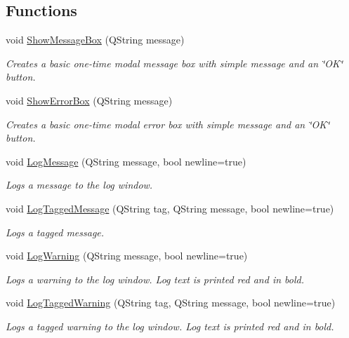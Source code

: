 \subsection*{Functions}
\begin{DoxyCompactItemize}
\item 
void \hyperlink{group___global_variables_ga9551f73a6927861d0b6f5d7901c90888}{Show\-Message\-Box} (Q\-String message)
\begin{DoxyCompactList}\small\item\em Creates a basic one-\/time modal message box with simple message and an \char`\"{}\-O\-K\char`\"{} button. \end{DoxyCompactList}\item 
void \hyperlink{group___global_variables_gadf8a13f3d23660f424828d7f559addd3}{Show\-Error\-Box} (Q\-String message)
\begin{DoxyCompactList}\small\item\em Creates a basic one-\/time modal error box with simple message and an \char`\"{}\-O\-K\char`\"{} button. \end{DoxyCompactList}\item 
void \hyperlink{group___global_variables_ga9bb2d01dee132ec096040ba459b4e2e4}{Log\-Message} (Q\-String message, bool newline=true)
\begin{DoxyCompactList}\small\item\em Logs a message to the log window. \end{DoxyCompactList}\item 
void \hyperlink{group___global_variables_ga577d74a77b480346d9aa74680d6e7020}{Log\-Tagged\-Message} (Q\-String tag, Q\-String message, bool newline=true)
\begin{DoxyCompactList}\small\item\em Logs a tagged message. \end{DoxyCompactList}\item 
void \hyperlink{group___global_variables_gabfd623074e3c2d311ca356321a5b839a}{Log\-Warning} (Q\-String message, bool newline=true)
\begin{DoxyCompactList}\small\item\em Logs a warning to the log window. Log text is printed red and in bold. \end{DoxyCompactList}\item 
void \hyperlink{group___global_variables_ga9765b2cee902fd2d265b2ddc307aecb2}{Log\-Tagged\-Warning} (Q\-String tag, Q\-String message, bool newline=true)
\begin{DoxyCompactList}\small\item\em Logs a tagged warning to the log window. Log text is printed red and in bold. \end{DoxyCompactList}\end{DoxyCompactItemize}
